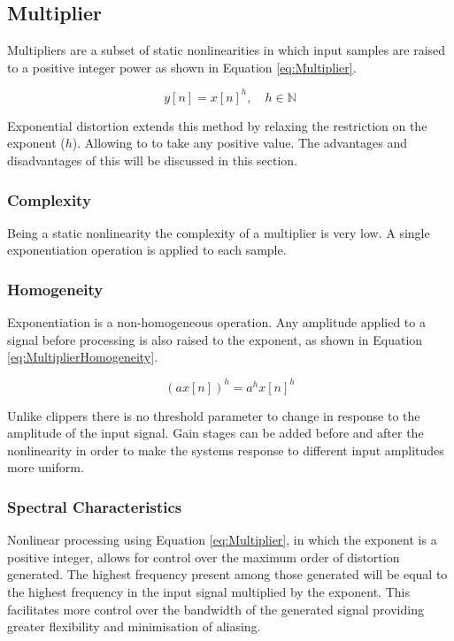 
	\subsection{Multiplier}
	\label{sec:Excitation-Multiplier}
		Multipliers are a subset of static nonlinearities in which input samples are raised to a positive integer
		power as shown in Equation \ref{eq:Multiplier}.

		\begin{equation}
			y[n] = x[n]^{h}, \quad h \in \mathbb{N}
			\label{eq:Multiplier}
		\end{equation}

		Exponential distortion extends this method by relaxing the restriction on the exponent ($h$). Allowing to
		to take any positive value. The advantages and disadvantages of this will be discussed in this section.

		\subsubsection*{Complexity}
			Being a static nonlinearity the complexity of a multiplier is very low. A single exponentiation
			operation is applied to each sample. 

		\subsubsection*{Homogeneity}
			Exponentiation is a non-homogeneous operation. Any amplitude applied to a signal before processing
			is also raised to the exponent, as shown in Equation \ref{eq:MultiplierHomogeneity}.

			\begin{equation}
				(ax[n])^{h} = a^{h}x[n]^{h}
				\label{eq:MultiplierHomogeneity}
			\end{equation}

			Unlike clippers there is no threshold parameter to change in response to the amplitude of the input
			signal. Gain stages can be added before and after the nonlinearity in order to make the systems
			response to different input amplitudes more uniform.
			
		\subsubsection*{Spectral Characteristics}
			Nonlinear processing using Equation \ref{eq:Multiplier}, in which the exponent is a positive
			integer, allows for control over the maximum order of distortion generated. The highest frequency
			present among those generated will be equal to the highest frequency in the input signal multiplied
			by the exponent. This facilitates more control over the bandwidth of the generated signal providing
			greater flexibility and minimisation of aliasing.

